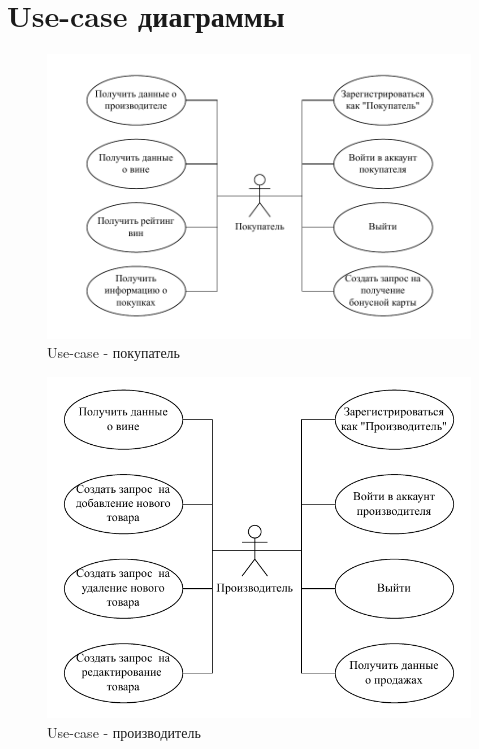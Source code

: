 \section{Use-case диаграммы}

\begin{figure}[H]
	\begin{center}
		\includegraphics[scale=0.8]{img/customer.pdf}
	\end{center}
	\captionsetup{justification=centering}
	\caption{Use-case - покупатель}
	\label{img:customer}
\end{figure}

\begin{figure}[H]
	\begin{center}
		\includegraphics[scale=0.8]{img/manufacturer.pdf}
	\end{center}
	\captionsetup{justification=centering}
	\caption{Use-case - производитель}
	\label{img:manufacturer}
\end{figure}

